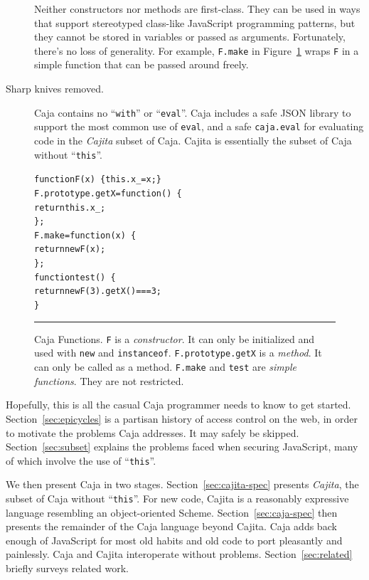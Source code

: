 \documentclass[letterpaper,twocolumn,10pt]{article}
\newcommand{\code}[1]{{\tt {#1}}}              %
\begin{document}
\begin{description}
  Neither constructors nor methods are first-class. They can be used in ways 
  that support stereotyped class-like JavaScript programming patterns, but 
  they cannot be stored in variables or passed as arguments. Fortunately, 
  there's no loss of generality. For example, \code{F.make} in 
  Figure~\ref{fig:func-obj} wraps \code{F} in a simple function that can be 
  passed around freely.
 
  \item[Sharp knives removed.] Caja contains no ``\code{with}'' or 
  ``\code{eval}''. Caja includes a safe JSON library to support the most 
  common use of \code{eval}, and a safe \code{caja.eval} for evaluating code 
  in the \emph{Cajita} subset of Caja. Cajita is essentially the subset of
  Caja without ``\code{this}''. 
 
\end{description}

\begin{figure}[t!]
\begin{alltt}
function F(x)\ \{ this.x_ = x; \}
F.prototype.getX = function()\ \{
  return this.x_;
\};
F.make = function(x)\ \{
  return new F(x);
\};
function test()\ \{
  return new F(3).getX() === 3;
\}
\end{alltt}

\caption[Caja Functions]{Caja Functions. \code{F} is a \emph{constructor}. It 
can only be initialized and used with \code{new} and \code{instanceof}. 
\code{F.prototype.getX} is a \emph{method}. It can only be called as a 
method. \code{F.make} and \code{test} are \emph{simple functions}. They are
not restricted. \\ } \hrule
\label{fig:func-obj}
\end{figure}

Hopefully, this is all the casual Caja programmer needs to know to get 
started. Section~\ref{sec:epicycles} is a partisan history of access control 
on the web, in order to motivate the problems Caja addresses. It may safely 
be skipped. Section~\ref{sec:subset} explains the problems faced when 
securing JavaScript, many of which involve the use of ``\code{this}''.

We then present Caja in two stages. Section~\ref{sec:cajita-spec} presents 
\emph{Cajita}, the subset of Caja without ``\code{this}''. For new code, 
Cajita is a reasonably expressive language resembling an object-oriented 
Scheme. Section~\ref{sec:caja-spec} then presents the remainder of the Caja 
language beyond Cajita. Caja adds back enough of JavaScript for most old 
habits and old code to port pleasantly and painlessly. Caja and Cajita 
interoperate without problems. Section~\ref{sec:related} briefly 
surveys related work.
\end{document}
